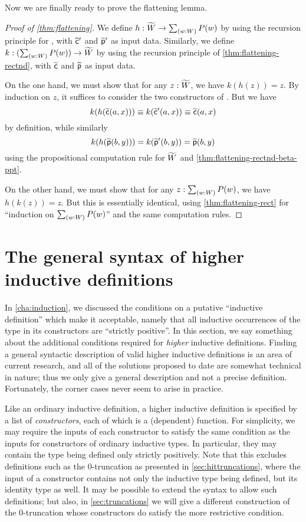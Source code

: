 Now we are finally ready to prove the flattening lemma.

\begin{proof}[Proof of \autoref{thm:flattening}]
  We define $h:\Wtil \to \sm{w:W}P(w)$ by using the recursion principle for \Wtil, with $\widetilde{\mathsf{c}}'$ and $\widetilde{\mathsf{p}}'$ as input data.
  Similarly, we define $k:(\sm{w:W}P(w)) \to \Wtil$ by using the recursion principle of \autoref{thm:flattening-rectnd}, with $\widetilde{\mathsf{c}}$ and $\widetilde{\mathsf{p}}$ as input data.

  On the one hand, we must show that for any $z:\widetilde{W}$, we have $k(h(z))=z$.
  By induction on $z$, it suffices to consider the two constructors of \Wtil.
  But we have
  \[k(h(\widetilde{\mathsf{c}}(a,x))) \equiv k(\widetilde{\mathsf{c}}'(a,x)) \equiv \widetilde{\mathsf{c}}(a,x)\]
  by definition, while similarly
  \[{k}\mathopen{}\left({{h}\mathopen{}\left({\widetilde{\mathsf{p}}(b,y)}\right)\mathclose{}}\right)\mathclose{} = {k}\mathopen{}\left({\widetilde{\mathsf{p}}'(b,y)}\right)\mathclose{} = \widetilde{\mathsf{p}}(b,y) \]
  using the propositional computation rule for $\widetilde{W}$ and \autoref{thm:flattening-rectnd-beta-ppt}.

  On the other hand, we must show that for any $z:\sm{w:W}P(w)$, we have $h(k(z))=z$.
  But this is essentially identical, using \autoref{thm:flattening-rect} for ``induction on $\sm{w:W}P(w)$'' and the same computation rules.
\end{proof}

\section{The general syntax of higher inductive definitions}
\label{sec:naturality}

In \autoref{cha:induction}, we discussed the conditions on a putative ``inductive definition'' which make it acceptable, namely that all inductive occurrences of the type in its constructors are ``strictly positive''.
In this section, we say something about the additional conditions required for \emph{higher} inductive definitions.
Finding a general syntactic description of valid higher inductive definitions is an area of current research, and all of the solutions proposed to date are somewhat technical in nature; thus we only give a general description and not a precise definition.
Fortunately, the corner cases never seem to arise in practice.

Like an ordinary inductive definition, a higher inductive definition is specified by a list of \emph{constructors}, each of which is a (dependent) function.
For simplicity, we may require the inputs of each constructor to satisfy the same condition as the inputs for constructors of ordinary inductive types.
In particular, they may contain the type being defined only strictly positively.
Note that this excludes definitions such as the $0$-truncation as presented in \autoref{sec:hittruncations}, where the input of a constructor contains not only the inductive type being defined, but its identity type as well.
It may be possible to extend the syntax to allow such definitions; but also, in \autoref{sec:truncations} we will give a different construction of the $0$-truncation whose constructors do satisfy the more restrictive condition.

